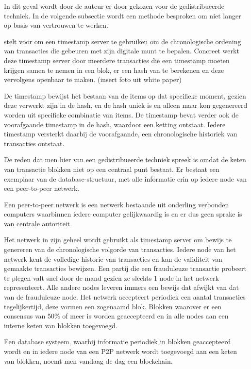	In dit geval wordt door de auteur er door \textcite{Nakamoto2008} gekozen voor de gedistribueerde techniek. In de volgende subsectie wordt een methode besproken om niet langer op basis van vertrouwen te werken.
	
	\textcite{Nakamoto2008} stelt voor om een timestamp server te gebruiken om de chronologische ordening van transacties die gebeuren met zijn digitale munt te bepalen.  Concreet werkt deze timestamp server door meerdere transacties die een timestamp moeten krijgen samen te nemen in een blok, er een hash van te berekenen en deze vervolgens openbaar te maken. (insert foto uit white paper)
	
	De timestamp bewijst het bestaan van de items op dat specifieke moment, gezien deze verwerkt zijn in de hash, en de hash uniek is en alleen maar kon gegenereerd worden uit specifieke combinatie van items. De timestamp bevat verder ook de voorafgaande timestamp in de hash, waardoor een ketting ontstaat. Iedere timestamp versterkt daarbij de voorafgaande, een chronologische historiek van transacties ontstaat.
	
	De reden dat men hier van een gedistribueerde techniek spreek is omdat de keten van transactie blokken niet op een centraal punt bestaat. Er bestaat een exemplaar van de database-structuur, met alle informatie erin op iedere node van een peer-to-peer netwerk. 
	
	Een peer-to-peer netwerk is een netwerk bestaande uit onderling verbonden computers waarbinnen iedere computer gelijkwaardig is en er dus geen sprake is van centrale autoriteit. 
	
	Het netwerk in zijn geheel wordt gebruikt als timestamp server om bewijs te genereren van de chronologische volgorde van transacties. Iedere node van het netwerk kent de volledige historie van transacties en kan de validiteit van gemaakte transacties bewijzen. Een partij die een frauduleuze transactie probeert te plegen valt snel door de mand gezien ze slechts 1 node in het netwerk representeert. Alle andere nodes leveren immers een bewijs dat afwijkt van dat van de frauduleuze node. Het netwerk accepteert periodiek een aantal transacties tegelijkertijd, deze vormen een zogenaamd blok. Blokken waarover er een consensus van 50\% of meer is worden geaccepteerd en in alle nodes aan een interne keten van blokken toegevoegd.
	
	Een database systeem, waarbij informatie periodiek in blokken geaccepteerd wordt en in iedere node van een P2P netwerk wordt toegevoegd aan een keten van blokken, noemt men vandaag de dag een blockchain.
	
